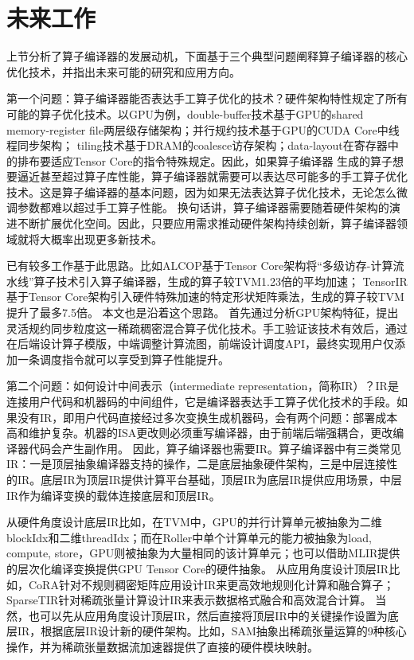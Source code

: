 \section{未来工作}
上节分析了算子编译器的发展动机，下面基于三个典型问题阐释算子编译器的核心优化技术，并指出未来可能的研究和应用方向。

第一个问题：算子编译器能否表达手工算子优化的技术？硬件架构特性规定了所有可能的算子优化技术。以GPU为例，double-buffer技术基于GPU的shared memory-register file两层级存储架构\cite{double-buffer}；并行规约技术基于GPU的CUDA Core中线程同步架构\cite{parallel-reduction}；
tiling技术基于DRAM的coalesce访存架构\cite{coalesce}；data-layout在寄存器中的排布要适应Tensor Core的指令特殊规定\cite{DynamicNM}。因此，如果算子编译器
生成的算子想要逼近甚至超过算子库性能，算子编译器就需要可以表达尽可能多的手工算子优化技术。这是算子编译器的基本问题，因为如果无法表达算子优化技术，无论怎么微调参数都难以超过手工算子性能。
换句话讲，算子编译器需要随着硬件架构的演进不断扩展优化空间。因此，只要应用需求推动硬件架构持续创新，算子编译器领域就将大概率出现更多新技术。

已有较多工作基于此思路。比如ALCOP\cite{ALCOP}基于Tensor Core架构将“多级访存-计算流水线”算子技术引入算子编译器，生成的算子较TVM1.23倍的平均加速；
TensorIR\cite{TensorIR}基于Tensor Core架构引入硬件特殊加速的特定形状矩阵乘法，生成的算子较TVM提升了最多7.5倍。 本文也是沿着这个思路。
首先通过分析GPU架构特征，提出灵活规约同步粒度这一稀疏稠密混合算子优化技术。手工验证该技术有效后，通过在后端设计算子模版，中端调整计算流图，前端设计调度API，最终实现用户仅添加一条调度指令就可以享受到算子性能提升。

第二个问题：如何设计中间表示（intermediate representation，简称IR）？IR是连接用户代码和机器码的中间组件\cite{IR}，它是编译器表达手工算子优化技术的手段。如果没有IR，即用户代码直接经过多次变换生成机器码，会有两个问题：部署成本高和维护复杂。机器的ISA更改则必须重写编译器，由于前端后端强耦合，更改编译器代码会产生副作用\cite{LLVM}。
因此，算子编译器也需要IR。算子编译器中有三类常见IR：一是顶层抽象编译器支持的操作，二是底层抽象硬件架构，三是中层连接性的IR。底层IR为顶层IR提供计算平台基础，顶层IR为底层IR提供应用场景，中层IR作为编译变换的载体连接底层和顶层IR。

从硬件角度设计底层IR比如，在TVM\cite{tvm}中，GPU的并行计算单元被抽象为二维blockIdx和二维threadIdx；而在Roller\cite{Roller}中单个计算单元的能力被抽象为load, compute, store，GPU则被抽象为大量相同的该计算单元；也可以借助MLIR提供的层次化编译变换提供GPU Tensor Core的硬件抽象\cite{mlir-tc}。
从应用角度设计顶层IR比如，CoRA\cite{CoRA}针对不规则稠密矩阵应用设计IR来更高效地规则化计算和融合算子；SparseTIR\cite{SparseTIR}针对稀疏张量计算设计IR来表示数据格式融合和高效混合计算。
当然，也可以先从应用角度设计顶层IR，然后直接将顶层IR中的关键操作设置为底层IR，根据底层IR设计新的硬件架构。比如，SAM\cite{SAM}抽象出稀疏张量运算的9种核心操作，并为稀疏张量数据流加速器提供了直接的硬件模块映射。

